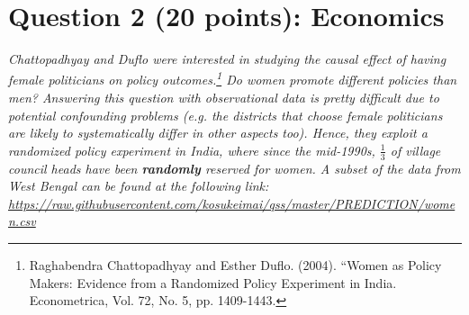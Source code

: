 \documentclass[12pt,letterpaper]{article}
\begin{document}
\newpage

\section*{Question 2 (20 points): Economics}
\textit{Chattopadhyay and Duflo were interested in studying the causal effect of having female politicians on policy outcomes.\footnote{Raghabendra Chattopadhyay and Esther Duflo. (2004). ``Women as Policy Makers: Evidence from a Randomized Policy Experiment in India. Econometrica, Vol. 72, No. 5, pp. 1409-1443.} Do women promote different policies than men? Answering this question with observational data is pretty difficult due to potential confounding problems (e.g. the districts that choose female politicians are likely to systematically differ in other aspects too). Hence, they exploit a randomized policy experiment in India, where since the mid-1990s, $\frac{1}{3}$ of village council heads have been {\bf{randomly}} reserved for women. A subset of the data from West Bengal can be found at the following link: \url{https://raw.githubusercontent.com/kosukeimai/qss/master/PREDICTION/women.csv}}\\
\end{document}
